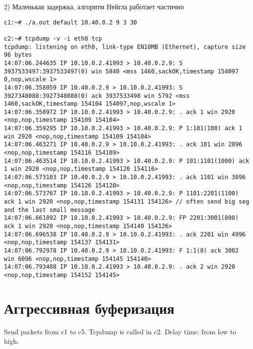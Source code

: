 \documentclass[a4paper,12pt]{article}
\begin{document}
2) Маленькая задержка, алгоритм Нейгла работает частично
\begin{lstlisting}
c1:~# ./a.out default 10.40.0.2 9 3 30

c2:~# tcpdump -v -i eth0 tcp
tcpdump: listening on eth0, link-type EN10MB (Ethernet), capture size 96 bytes
14:07:06.244635 IP 10.10.0.2.41993 > 10.40.0.2.9: S 3937533497:3937533497(0) win 5840 <mss 1460,sackOK,timestamp 154097 0,nop,wscale 1>
14:07:06.358059 IP 10.40.0.2.9 > 10.10.0.2.41993: S 3927348088:3927348088(0) ack 3937533498 win 5792 <mss 1460,sackOK,timestamp 154104 154097,nop,wscale 1>
14:07:06.358972 IP 10.10.0.2.41993 > 10.40.0.2.9: . ack 1 win 2920 <nop,nop,timestamp 154109 154104>
14:07:06.359295 IP 10.10.0.2.41993 > 10.40.0.2.9: P 1:101(100) ack 1 win 2920 <nop,nop,timestamp 154109 154104>
14:07:06.463271 IP 10.40.0.2.9 > 10.10.0.2.41993: . ack 101 win 2896 <nop,nop,timestamp 154116 154109>
14:07:06.463514 IP 10.10.0.2.41993 > 10.40.0.2.9: P 101:1101(1000) ack 1 win 2920 <nop,nop,timestamp 154120 154116>
14:07:06.573103 IP 10.40.0.2.9 > 10.10.0.2.41993: . ack 1101 win 3896 <nop,nop,timestamp 154126 154120>
14:07:06.573767 IP 10.10.0.2.41993 > 10.40.0.2.9: P 1101:2201(1100) ack 1 win 2920 <nop,nop,timestamp 154131 154126> // often send big seg and the last small message
14:07:06.661892 IP 10.10.0.2.41993 > 10.40.0.2.9: FP 2201:3001(800) ack 1 win 2920 <nop,nop,timestamp 154140 154126>
14:07:06.696538 IP 10.40.0.2.9 > 10.10.0.2.41993: . ack 2201 win 4996 <nop,nop,timestamp 154137 154131>
14:07:06.792978 IP 10.40.0.2.9 > 10.10.0.2.41993: F 1:1(0) ack 3002 win 6096 <nop,nop,timestamp 154145 154140>
14:07:06.793408 IP 10.10.0.2.41993 > 10.40.0.2.9: . ack 2 win 2920 <nop,nop,timestamp 154152 154145>
\end{lstlisting}


\section{Аггрессивная буферизация}
Send packets from c1 to c5. Tcpdump is called in c2. Delay time: from low to high.
\end{document}
